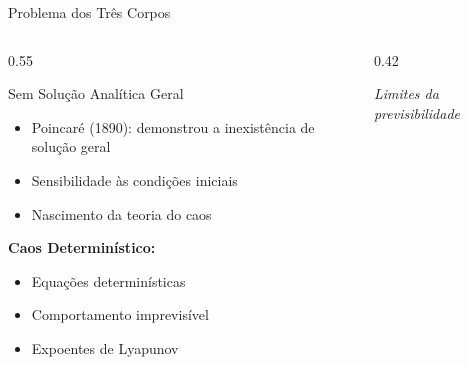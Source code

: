 \documentclass[aspectratio=169,12pt]{beamer}
\begin{document}
\begin{frame}{Problema dos Três Corpos}
    \begin{columns}[T]
        \begin{column}{0.55\textwidth}
            \begin{alertblock}{Sem Solução Analítica Geral}
                \begin{itemize}
                    \item Poincaré (1890): demonstrou a inexistência de solução geral
                    \item Sensibilidade às condições iniciais
                    \item Nascimento da teoria do caos
                \end{itemize}
            \end{alertblock}

            \vspace{0.3cm}

            \textbf{Caos Determinístico:}
            \begin{itemize}
                \item Equações determinísticas
                \item Comportamento imprevisível
                \item Expoentes de Lyapunov
            \end{itemize}
        \end{column}
        \begin{column}{0.42\textwidth}
            \begin{center}
            \end{center}

            \vspace{0.3cm}
            \textit{Limites da previsibilidade}
        \end{column}
    \end{columns}
\end{frame}
\end{document}
